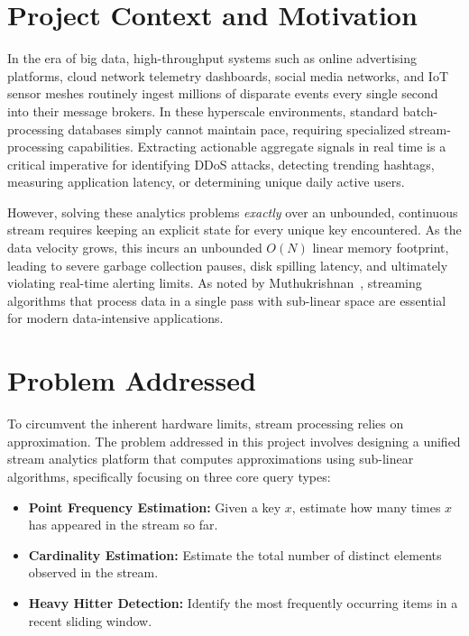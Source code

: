 \section{Project Context and Motivation}

In the era of big data, high-throughput systems such as online advertising platforms, cloud network telemetry dashboards, social media networks, and IoT sensor meshes routinely ingest millions of disparate events every single second into their message brokers. In these hyperscale environments, standard batch-processing databases simply cannot maintain pace, requiring specialized stream-processing capabilities. Extracting actionable aggregate signals in real time is a critical imperative for identifying DDoS attacks, detecting trending hashtags, measuring application latency, or determining unique daily active users.

However, solving these analytics problems \textit{exactly} over an unbounded, continuous stream requires keeping an explicit state for every unique key encountered. As the data velocity grows, this incurs an unbounded $O(N)$ linear memory footprint, leading to severe garbage collection pauses, disk spilling latency, and ultimately violating real-time alerting limits. As noted by Muthukrishnan~\cite{muthukrishnan2005data}, streaming algorithms that process data in a single pass with sub-linear space are essential for modern data-intensive applications.

\section{Problem Addressed}

To circumvent the inherent hardware limits, stream processing relies on approximation. The problem addressed in this project involves designing a unified stream analytics platform that computes approximations using sub-linear algorithms, specifically focusing on three core query types:

\begin{itemize}
    \item \textbf{Point Frequency Estimation:} Given a key $x$, estimate how many times $x$ has appeared in the stream so far.
    \item \textbf{Cardinality Estimation:} Estimate the total number of distinct elements observed in the stream.
    \item \textbf{Heavy Hitter Detection:} Identify the most frequently occurring items in a recent sliding window.
\end{itemize}


